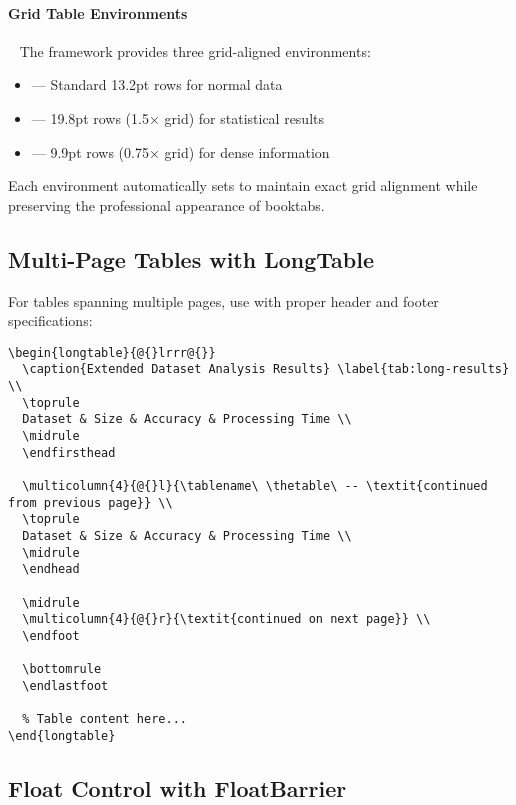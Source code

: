 \documentclass[11pt]{article}
\begin{document}
\paragraph{Grid Table Environments}~ The framework provides three grid-aligned environments:
\begin{itemize}
\item {} --- Standard 13.2pt rows for normal data
\item {} --- 19.8pt rows (1.5× grid) for statistical results
\item {} --- 9.9pt rows (0.75× grid) for dense information
\end{itemize}

Each environment automatically sets  to maintain exact grid alignment while preserving the professional appearance of booktabs.

\subsection{Multi-Page Tables with LongTable}

For tables spanning multiple pages, use  with proper header and footer specifications:

\begin{verbatim}
\begin{longtable}{@{}lrrr@{}}
  \caption{Extended Dataset Analysis Results} \label{tab:long-results} \\
  \toprule
  Dataset & Size & Accuracy & Processing Time \\
  \midrule
  \endfirsthead
  
  \multicolumn{4}{@{}l}{\tablename\ \thetable\ -- \textit{continued from previous page}} \\
  \toprule
  Dataset & Size & Accuracy & Processing Time \\
  \midrule
  \endhead
  
  \midrule
  \multicolumn{4}{@{}r}{\textit{continued on next page}} \\
  \endfoot
  
  \bottomrule
  \endlastfoot
  
  % Table content here...
\end{longtable}
\end{verbatim}

\subsection{Float Control with FloatBarrier}
\end{document}
